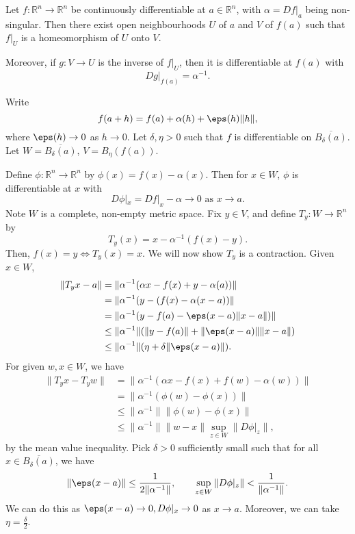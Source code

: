 \documentclass[12pt]{article}
\begin{document}
\begin{theorem}
	Let $f : \mathbb{R}^{n} \to \mathbb{R}^{n}$ be continuously differentiable at $a \in \mathbb{R}^{n}$, with $\alpha = Df|_a$ being non-singular. Then there exist open neighbourhoods $U$ of $a$ and $V$ of $f(a)$ such that $f|_U$ is a homeomorphism of $U$ onto $V$.

	Moreover, if $g : V \to U$ is the inverse of $f|_U$, then it is differentiable at $f(a)$ with
	\[
	Dg|_{f(a)} = \alpha^{-1}
	.\]
\end{theorem}

\begin{proofbox}
	Write
	\[
	f(a+h) = f(a) + \alpha(h) + \eps(h) \|h\|
	,\]
	where $\eps(h) \to 0$ as $h \to 0$. Let $\delta, \eta > 0$ such that $f$ is differentiable on $\overline{B_{\delta}(a)}$. Let $W = \overline{B_{\delta}(a)}$, $V = B_{\eta}(f(a))$.

	Define $\phi : \mathbb{R}^{n} \to \mathbb{R}^{n}$ by $\phi(x) = f(x) - \alpha(x)$. Then for $x \in W$, $\phi$ is differentiable at $x$ with
	\[
		D\phi|_x = Df|_x - \alpha \to 0 \text{ as } x \to a
	.\]
	Note $W$ is a complete, non-empty metric space. Fix $y \in V$, and define $T_y : W \to \mathbb{R}^{n}$ by
	\[
	T_y(x) = x - \alpha^{-1}(f(x) - y)
	.\]
	Then, $f(x) = y \iff T_y(x) = x$. We will now show $T_y$ is a contraction. Given $x \in W$,
	\begin{align*}
		\|T_yx-a\| &= \|\alpha^{-1}(\alpha x - f(x) + y - \alpha(a))\| \\
			   &= \| \alpha^{-1}(y - (f(x) - \alpha(x - a))\| \\
			   &= \|\alpha^{-1}(y - f(a) - \eps(x - a) \|x - a\|) \| \\
			   &\leq \|\alpha^{-1}\| (\|y - f(a)\| + \|\eps(x-a)\|\|x-a\|) \\
			   &\leq \|\alpha^{-1}\|(\eta + \delta \|\eps(x-a)\|).
	\end{align*}
	For given $w, x \in W$, we have
	\begin{align*}
		\|T_y x - T_y w \| &= \| \alpha^{-1}(\alpha x - f(x) + f(w) - \alpha(w)) \| \\
				   &= \|\alpha^{-1}(\phi(w) - \phi(x)) \| \\
				   &\leq \|\alpha^{-1}\|\|\phi(w)-\phi(x)\| \\
				   &\leq \|\alpha^{-1}\| \|w - x\| \sup_{z \in W}\|D\phi|_z\|,
	\end{align*}
	by the mean value inequality. Pick $\delta > 0$ sufficiently small such that for all $x \in \overline{B_{\delta}(a)}$, we have
	\[
	\|\eps(x - a)\| \leq \frac{1}{2\|\alpha^{-1}\|}, \qquad \sup_{z \in W}\|D\phi|_z\| < \frac{1}{\|\alpha^{-1}\|}
	.\]
	We can do this as $\eps(x - a) \to 0, D\phi|_x \to 0$ as $x \to a$. Moreover, we can take $\eta = \frac{\delta}{2}$.


\end{proofbox}
\end{document}
